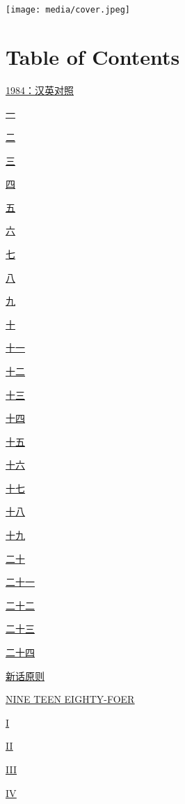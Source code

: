 \texttt{[image: media/cover.jpeg]}

\section{Table of Contents}\label{table-of-contents}

\hyperref[ux4e00]{\ul{1984：汉英对照}}

\hyperref[ux4e00]{\ul{一}}

\hyperref[ux4e8c]{\ul{二}}

\hyperref[ux4e09]{\ul{三}}

\hyperref[ux56db]{\ul{四}}

\hyperref[ux4e94]{\ul{五}}

\hyperref[ux516d]{\ul{六}}

\hyperref[ux4e03]{\ul{七}}

\hyperref[ux516b]{\ul{八}}

\hyperref[ux4e5d]{\ul{九}}

\hyperref[ux5341]{\ul{十}}

\hyperref[ux5341ux4e00]{\ul{十一}}

\hyperref[ux5341ux4e8c]{\ul{十二}}

\hyperref[ux5341ux4e09]{\ul{十三}}

\hyperref[ux5341ux56db]{\ul{十四}}

\hyperref[ux5341ux4e94]{\ul{十五}}

\hyperref[ux5341ux516d]{\ul{十六}}

\hyperref[ux5341ux4e03]{\ul{十七}}

\hyperref[ux5341ux516b]{\ul{十八}}

\hyperref[ux5341ux4e5d]{\ul{十九}}

\hyperref[ux4e8cux5341]{\ul{二十}}

\hyperref[ux4e8cux5341ux4e00]{\ul{二十一}}

\hyperref[ux4e8cux5341ux4e8c]{\ul{二十二}}

\hyperref[ux4e8cux5341ux4e09]{\ul{二十三}}

\hyperref[ux4e8cux5341ux56db]{\ul{二十四}}

\hyperref[ux65b0ux8bddux539fux5219]{\ul{新话原则}}

\hyperref[i]{\ul{NINE TEEN EIGHTY-FOER}}

\hyperref[i]{\ul{I}}

\hyperref[ux4e00]{\ul{II}}

\hyperref[ux4e8c]{\ul{III}}

\hyperref[ux4e8c]{\ul{IV}}

